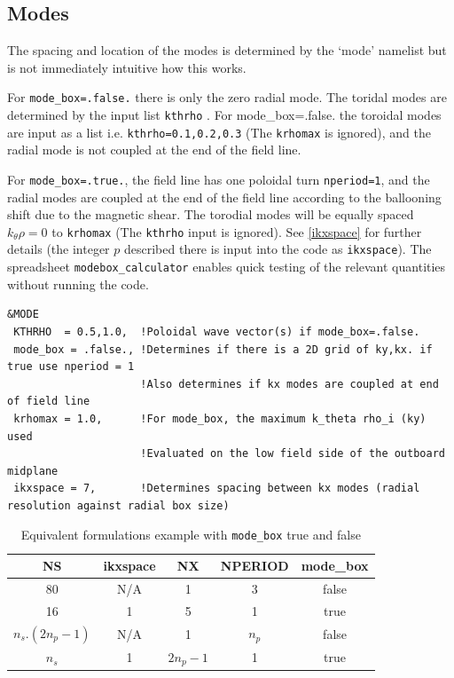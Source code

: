 \documentclass{report}
\begin{document}
\subsection{Modes}
The spacing and location of the modes is determined by the `mode' namelist but is not immediately intuitive how this works.  

For \texttt{mode\_box=.false.} there is only the zero radial mode. The toridal modes are determined by the input list \texttt{kthrho} . For {mode\_box=.false.} the toroidal modes are input as a list i.e. \texttt{kthrho=0.1,0.2,0.3} (The \texttt{krhomax} is ignored), and the radial mode is not coupled at the end of the field line.

For \texttt{mode\_box=.true.}, the field line has one poloidal turn \texttt{nperiod=1}, and the radial modes are coupled at the end of the field line according to the ballooning shift due to the magnetic shear.  The torodial modes will be equally spaced $k_\theta\rho =0$ to \texttt{krhomax} (The \texttt{kthrho} input is ignored).  See \ref{ikxspace} for further details (the integer $p$ described there is input into the code as \texttt{ikxspace}).  The spreadsheet \texttt{modebox\_calculator} enables quick testing of the relevant quantities without running the code.

\begin{footnotesize}\begin{verbatim}
&MODE
 KTHRHO  = 0.5,1.0,  !Poloidal wave vector(s) if mode_box=.false.
 mode_box = .false., !Determines if there is a 2D grid of ky,kx. if true use nperiod = 1
                     !Also determines if kx modes are coupled at end of field line
 krhomax = 1.0,      !For mode_box, the maximum k_theta rho_i (ky) used
                     !Evaluated on the low field side of the outboard midplane
 ikxspace = 7,       !Determines spacing between kx modes (radial resolution against radial box size)
\end{verbatim}\end{footnotesize}

\begin{table}[h!]
\begin{center}
\begin{tabular}{ccccc}
 NS & ikxspace & NX & NPERIOD & mode\_box \\
\hline
 80      &    N/A   &  1  &    3    & false    \\
 16      &     1    &  5  &    1    & true     \\ 
\hline
 $n_s.(2n_p-1)$ &    N/A   &  1  &    $n_p$    & false    \\
 $n_s$    &     1    & $2n_p-1$ &  1   & true   \\

\end{tabular}
\caption{Equivalent formulations example with \texttt{mode\_box} true and false}
\end{center}
\end{table}
\end{document}
